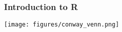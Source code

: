 \documentclass{beamer}
\begin{document}
	

  

\begin{frame}
	\frametitle{Introduction to R}
	\pause 
	\texttt{[image: figures/conway\_venn.png]} \\
\end{frame}
\end{document}
